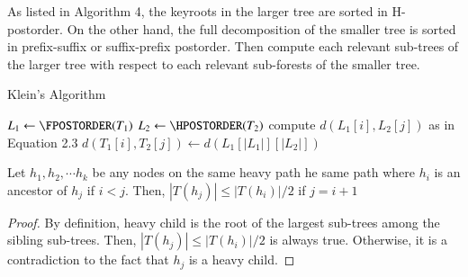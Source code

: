 As listed in Algorithm 4, the keyroots in the larger tree are sorted in H-postorder. On the other hand, the full decomposition of the smaller tree is sorted in prefix-suffix or suffix-prefix postorder. Then compute each relevant sub-trees of the larger tree with respect to each relevant sub-forests of the smaller tree. 

\IncMargin{1em}
\begin{algorithm}
  \caption{Klein's Algorithm}

    $L_1 \gets \FPOSTORDER(T_1)$\;
    $L_2 \gets \HPOSTORDER(T_2)$\;
     {
		 {
			compute $d(L_1[i], L_2[j])$ as in Equation 2.3
		}    
    }
    $d(T_1[i], T_2[j]) \gets d(L_1[\left\vert L_1 \right\vert][\left\vert L_2 \right\vert])$\;
    \;
\end{algorithm}
\DecMargin{1em}
\begin{lemma}
Let $h_1, h_2, \cdots h_k$ be any nodes on the same heavy path he same path where $h_i$ is an ancestor of $h_j$ if $i < j$. Then, $\left\vert T(h_j) \right\vert \leq \left\vert T(h_i) \right\vert / 2$ if $j=i+1$
\end{lemma}
\begin{proof}
By definition, heavy child is the root of the largest sub-trees among the sibling sub-trees. Then, $\left\vert T(h_j) \right\vert \leq \left\vert T(h_i) \right\vert / 2$ is always true. Otherwise, it is a contradiction to the fact that $h_j$ is a heavy child.
\end{proof}


